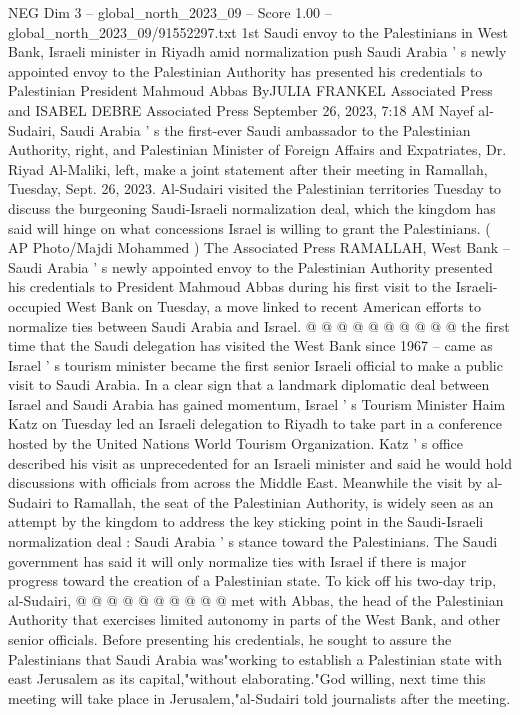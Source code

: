 \begin{textsample}{NEG Dim 3 – global\_north\_2023\_09 – Score 1.00 – global\_north\_2023\_09/91552297.txt}  \label{ex:f3_neg_392}
1st Saudi envoy to the Palestinians in West Bank, Israeli minister in Riyadh amid normalization push Saudi Arabia ' s newly appointed envoy to the Palestinian Authority has presented his credentials to Palestinian President Mahmoud Abbas ByJULIA FRANKEL Associated Press and ISABEL DEBRE Associated Press September 26, 2023, 7:18 AM Nayef al-Sudairi, Saudi Arabia ' s the first-ever Saudi ambassador to the Palestinian Authority, right, and Palestinian Minister of Foreign Affairs and Expatriates, Dr.
Riyad Al-Maliki, left, make a joint statement after their meeting in Ramallah, Tuesday, Sept. 26, 2023.
Al-Sudairi visited the Palestinian territories Tuesday to discuss the burgeoning Saudi-Israeli normalization deal, which the kingdom has said will hinge on what concessions Israel is willing to grant the Palestinians. ( AP Photo/Majdi Mohammed ) The Associated Press RAMALLAH, West Bank -- Saudi Arabia ' s newly appointed envoy to the Palestinian Authority presented his credentials to President Mahmoud Abbas during his first visit to the Israeli-occupied West Bank on Tuesday, a move linked to recent American efforts to normalize ties between Saudi Arabia and Israel. @ @ @ @ @ @ @ @ @ @ the first time that the Saudi delegation has visited the West Bank since 1967 -- came as Israel ' s tourism minister became the first senior Israeli official to make a public visit to Saudi Arabia.
In a clear sign that a landmark diplomatic deal between Israel and Saudi Arabia has gained momentum, Israel ' s Tourism Minister Haim Katz on Tuesday led an Israeli delegation to Riyadh to take part in a conference hosted by the United Nations World Tourism Organization.
Katz ' s office described his visit as unprecedented for an Israeli minister and said he would hold discussions with officials from across the Middle East.
Meanwhile the visit by al-Sudairi to Ramallah, the seat of the Palestinian Authority, is widely seen as an attempt by the kingdom to address the key sticking point in the Saudi-Israeli normalization deal : Saudi Arabia ' s stance toward the Palestinians.
The Saudi government has said it will only normalize ties with Israel if there is major progress toward the creation of a Palestinian state.
To kick off his two-day trip, al-Sudairi, @ @ @ @ @ @ @ @ @ @ met with Abbas, the head of the Palestinian Authority that exercises limited autonomy in parts of the West Bank, and other senior officials.
Before presenting his credentials, he sought to assure the Palestinians that Saudi Arabia was"working to establish a Palestinian state with east Jerusalem as its capital,"without elaborating."God willing, next time this meeting will take place in Jerusalem,"al-Sudairi told journalists after the meeting.

\end{textsample}
